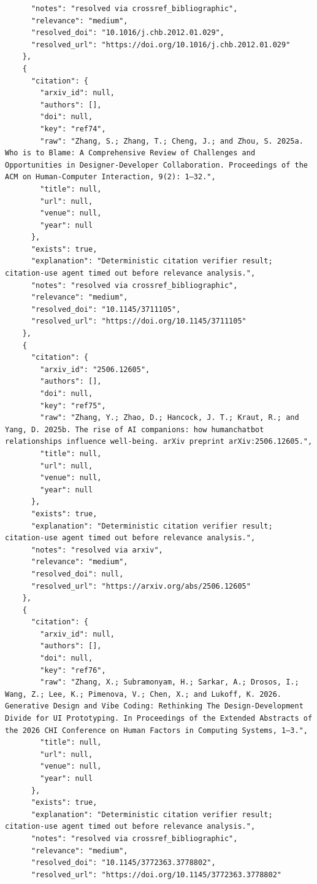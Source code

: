 \documentclass[11pt]{article}
\begin{document}
\begin{verbatim}
      "notes": "resolved via crossref_bibliographic",
      "relevance": "medium",
      "resolved_doi": "10.1016/j.chb.2012.01.029",
      "resolved_url": "https://doi.org/10.1016/j.chb.2012.01.029"
    },
    {
      "citation": {
        "arxiv_id": null,
        "authors": [],
        "doi": null,
        "key": "ref74",
        "raw": "Zhang, S.; Zhang, T.; Cheng, J.; and Zhou, S. 2025a. Who is to Blame: A Comprehensive Review of Challenges and Opportunities in Designer-Developer Collaboration. Proceedings of the ACM on Human-Computer Interaction, 9(2): 1–32.",
        "title": null,
        "url": null,
        "venue": null,
        "year": null
      },
      "exists": true,
      "explanation": "Deterministic citation verifier result; citation-use agent timed out before relevance analysis.",
      "notes": "resolved via crossref_bibliographic",
      "relevance": "medium",
      "resolved_doi": "10.1145/3711105",
      "resolved_url": "https://doi.org/10.1145/3711105"
    },
    {
      "citation": {
        "arxiv_id": "2506.12605",
        "authors": [],
        "doi": null,
        "key": "ref75",
        "raw": "Zhang, Y.; Zhao, D.; Hancock, J. T.; Kraut, R.; and Yang, D. 2025b. The rise of AI companions: how humanchatbot relationships influence well-being. arXiv preprint arXiv:2506.12605.",
        "title": null,
        "url": null,
        "venue": null,
        "year": null
      },
      "exists": true,
      "explanation": "Deterministic citation verifier result; citation-use agent timed out before relevance analysis.",
      "notes": "resolved via arxiv",
      "relevance": "medium",
      "resolved_doi": null,
      "resolved_url": "https://arxiv.org/abs/2506.12605"
    },
    {
      "citation": {
        "arxiv_id": null,
        "authors": [],
        "doi": null,
        "key": "ref76",
        "raw": "Zhang, X.; Subramonyam, H.; Sarkar, A.; Drosos, I.; Wang, Z.; Lee, K.; Pimenova, V.; Chen, X.; and Lukoff, K. 2026. Generative Design and Vibe Coding: Rethinking The Design-Development Divide for UI Prototyping. In Proceedings of the Extended Abstracts of the 2026 CHI Conference on Human Factors in Computing Systems, 1–3.",
        "title": null,
        "url": null,
        "venue": null,
        "year": null
      },
      "exists": true,
      "explanation": "Deterministic citation verifier result; citation-use agent timed out before relevance analysis.",
      "notes": "resolved via crossref_bibliographic",
      "relevance": "medium",
      "resolved_doi": "10.1145/3772363.3778802",
      "resolved_url": "https://doi.org/10.1145/3772363.3778802"

\end{verbatim}
\end{document}
